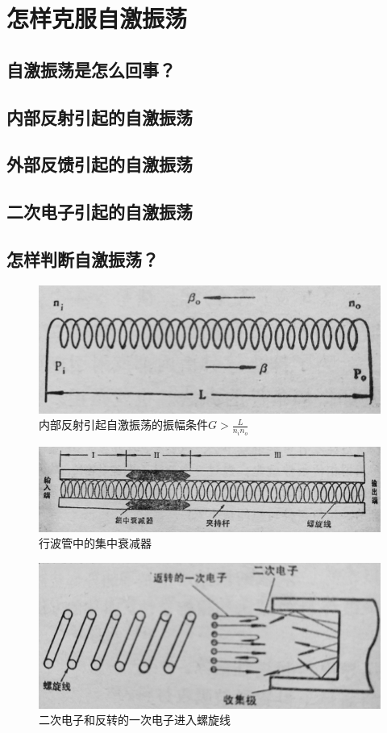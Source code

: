 \chapter{怎样克服自激振荡}\label{ch5}
\section{自激振荡是怎么回事？}
\section{内部反射引起的自激振荡}
\section{外部反馈引起的自激振荡}
\section{二次电子引起的自激振荡}
\section{怎样判断自激振荡？}







\begin{figure}[phtb]
	\centering
	\includegraphics[width=0.65\linewidth]{figure/ch5-1}
	\caption{内部反射引起自激振荡的振幅条件$ G>\frac{L}{n_i n_o} $}
	\label{ch5-1}
\end{figure}

\begin{figure}[phtb]
\centering
\includegraphics[width=0.65\linewidth]{figure/ch5-2}
\caption{行波管中的集中衰减器}
\label{ch5-2}
\end{figure}

\begin{figure}[phtb]
	\centering
	\includegraphics[width=0.65\linewidth]{figure/ch5-3}
	\caption{二次电子和反转的一次电子进入螺旋线}
	\label{ch5-3}
\end{figure}

